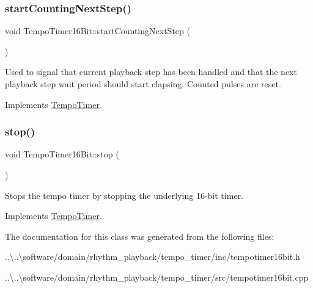 \subsubsection{\texorpdfstring{start\+Counting\+Next\+Step()}{startCountingNextStep()}}
{\footnotesize\ttfamily void Tempo\+Timer16\+Bit\+::start\+Counting\+Next\+Step (\begin{DoxyParamCaption}{ }\end{DoxyParamCaption})\hspace{0.3cm}{\ttfamily [virtual]}}

Used to signal that current playback step has been handled and that the next playback step wait period should start elapsing. Counted pulses are reset. 

Implements \mbox{\hyperlink{class_tempo_timer}{Tempo\+Timer}}.

\mbox{\label{class_tempo_timer16_bit_abb43b9ec84b965feaf3062aa1cb5be5e}} 
\subsubsection{\texorpdfstring{stop()}{stop()}}
{\footnotesize\ttfamily void Tempo\+Timer16\+Bit\+::stop (\begin{DoxyParamCaption}{ }\end{DoxyParamCaption})\hspace{0.3cm}{\ttfamily [virtual]}}

Stops the tempo timer by stopping the underlying 16-\/bit timer. 

Implements \mbox{\hyperlink{class_tempo_timer}{Tempo\+Timer}}.



The documentation for this class was generated from the following files\+:\begin{DoxyCompactItemize}
\item 
..\textbackslash{}..\textbackslash{}software/domain/rhythm\+\_\+playback/tempo\+\_\+timer/inc/tempotimer16bit.\+h\item 
..\textbackslash{}..\textbackslash{}software/domain/rhythm\+\_\+playback/tempo\+\_\+timer/src/tempotimer16bit.\+cpp\end{DoxyCompactItemize}
